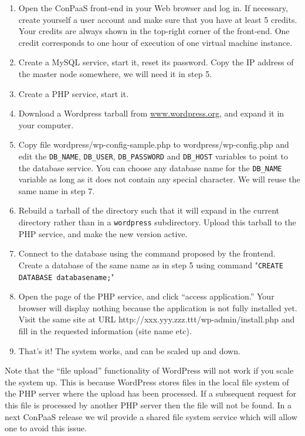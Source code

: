 \documentclass[10pt]{article}
\begin{document}
\begin{enumerate}
\item Open the ConPaaS front-end in your Web browser and log in. If
  necessary, create yourself a user account and make sure that you
  have at least 5 credits. Your credits are always shown in the
  top-right corner of the front-end. One credit corresponds to one
  hour of execution of one virtual machine instance.
\item Create a MySQL service, start it, reset its password. Copy the
  IP address of the master node somewhere, we will need it in step 5.
\item Create a PHP service, start it.
\item Download a Wordpress tarball from \url{www.wordpress.org}, and
  expand it in your computer.
\item Copy file wordpress/wp-config-sample.php to
  wordpress/wp-config.php and edit the \texttt{DB\_NAME},
  \texttt{DB\_USER}, \texttt{DB\_PASSWORD} and \texttt{DB\_HOST}
  variables to point to the database service. You can choose any
  database name for the \texttt{DB\_NAME} variable as long as it does
  not contain any special character. We will reuse the same name in
  step 7.
\item Rebuild a tarball of the directory such that it will expand in
  the current directory rather than in a \texttt{wordpress}
  subdirectory. Upload this tarball to the PHP service, and make the
  new version active. 
\item Connect to the database using the command proposed by the
  frontend. Create a database of the same name as in step 5 using
  command "\texttt{CREATE DATABASE databasename;}"
\item Open the page of the PHP service, and click ``access
  application.'' Your browser will display nothing because the
  application is not fully installed yet. Visit the same site at URL
  http://xxx.yyy.zzz.ttt/wp-admin/install.php and fill in the
  requested information (site name etc).
\item That's it! The system works, and can be scaled up and down. 
\end{enumerate}

Note that the ``file upload'' functionality of WordPress will not work
if you scale the system up. This is because WordPress stores files in
the local file system of the PHP server where the upload has been
processed. If a subsequent request for this file is processed by
another PHP server then the file will not be found. In a next ConPaaS
release we wil provide a shared file system service which will allow
one to avoid this issue.
\end{document}
